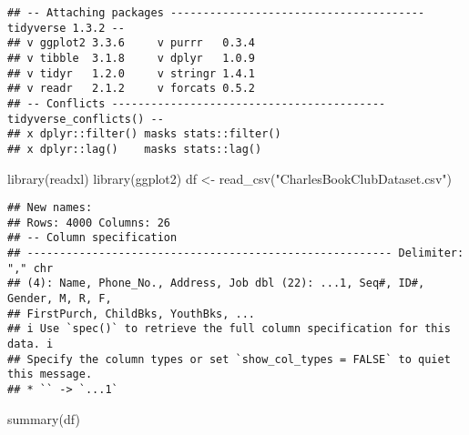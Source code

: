 \documentclass[
]{article}
\newenvironment{Shaded}{\begin{snugshade}}{\end{snugshade}}
\newcommand{\FunctionTok}[1]{\textcolor[rgb]{0.00,0.00,0.00}{#1}}
\newcommand{\NormalTok}[1]{#1}
\newcommand{\OtherTok}[1]{\textcolor[rgb]{0.56,0.35,0.01}{#1}}
\newcommand{\StringTok}[1]{\textcolor[rgb]{0.31,0.60,0.02}{#1}}
\begin{document}
\begin{verbatim}
## -- Attaching packages --------------------------------------- tidyverse 1.3.2 --
## v ggplot2 3.3.6     v purrr   0.3.4
## v tibble  3.1.8     v dplyr   1.0.9
## v tidyr   1.2.0     v stringr 1.4.1
## v readr   2.1.2     v forcats 0.5.2
## -- Conflicts ------------------------------------------ tidyverse_conflicts() --
## x dplyr::filter() masks stats::filter()
## x dplyr::lag()    masks stats::lag()
\end{verbatim}

\begin{Shaded}
\begin{Highlighting}[]
\FunctionTok{library}\NormalTok{(readxl)}
\FunctionTok{library}\NormalTok{(ggplot2)}
\NormalTok{df }\OtherTok{\textless{}{-}} \FunctionTok{read\_csv}\NormalTok{(}\StringTok{"CharlesBookClubDataset.csv"}\NormalTok{)}
\end{Highlighting}
\end{Shaded}

\begin{verbatim}
## New names:
## Rows: 4000 Columns: 26
## -- Column specification
## -------------------------------------------------------- Delimiter: "," chr
## (4): Name, Phone_No., Address, Job dbl (22): ...1, Seq#, ID#, Gender, M, R, F,
## FirstPurch, ChildBks, YouthBks, ...
## i Use `spec()` to retrieve the full column specification for this data. i
## Specify the column types or set `show_col_types = FALSE` to quiet this message.
## * `` -> `...1`
\end{verbatim}

\begin{Shaded}
\begin{Highlighting}[]
\FunctionTok{summary}\NormalTok{(df)}
\end{Highlighting}
\end{Shaded}
\end{document}
